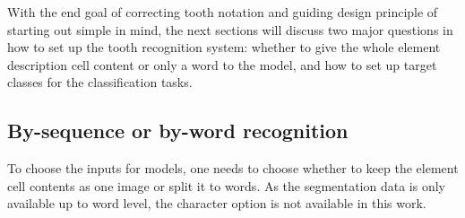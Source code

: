 \documentclass[english,twoside,openright]{UH_DS_MSc}
\begin{document}
With the end goal of correcting tooth notation and guiding design principle of starting out simple in mind, the next sections will discuss two major questions 
in how to set up the tooth recognition system: whether to give the whole element description cell content
 or only a word to the model, and how to set up target classes for the classification tasks.

\subsection{By-sequence or by-word recognition}

To choose the inputs for models, one needs to choose whether to keep the
element cell contents as one image or split it to words. As the segmentation 
data is only available up to word level, the character option is not available in this work.

\end{document}
